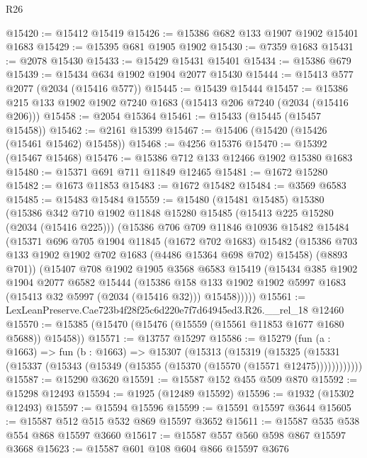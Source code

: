 \begin{lexlean}{R26}
\begin{coremodule}
@15420 := @15412 @15419
@15426 := @15386 @682 @133 @1907 @1902 @15401 @1683
@15429 := @15395 @681 @1905 @1902
@15430 := @7359 @1683
@15431 := @2078 @15430
@15433 := @15429 @15431 @15401
@15434 := @15386 @679
@15439 := @15434 @634 @1902 @1904 @2077 @15430
@15444 := @15413 @577 @2077 (@2034 (@15416 @577))
@15445 := @15439 @15444
@15457 := @15386 @215 @133 @1902 @1902 @7240 @1683 (@15413 @206 @7240 (@2034 (@15416 @206)))
@15458 := @2054 @15364
@15461 := @15433 (@15445 (@15457 @15458))
@15462 := @2161 @15399
@15467 := @15406 (@15420 (@15426 (@15461 @15462) @15458))
@15468 := @4256 @15376
@15470 := @15392 (@15467 @15468)
@15476 := @15386 @712 @133 @12466 @1902 @15380 @1683
@15480 := @15371 @691 @711 @11849 @12465
@15481 := @1672 @15280
@15482 := @1673 @11853
@15483 := @1672 @15482
@15484 := @3569 @6583
@15485 := @15483 @15484
@15559 := @15480
    (@15481 @15485)
    @15380
    (@15386
      @342
      @710
      @1902
      @11848
      @15280
      @15485
      (@15413 @225 @15280 (@2034 (@15416 @225)))
      (@15386
        @706
        @709
        @11846
        @10936
        @15482
        @15484
        (@15371
          @696
          @705
          @1904
          @11845
          (@1672 @702 @1683)
          @15482
          (@15386 @703 @133 @1902 @1902 @702 @1683 (@4486 @15364 @698 @702) @15458)
          (@8893 @701))
        (@15407
          @708
          @1902
          @1905
          @3568
          @6583
          @15419
          (@15434
            @385
            @1902
            @1904
            @2077
            @6582
            @15444
            (@15386
              @158
              @133
              @1902
              @1902
              @5997
              @1683
              (@15413 @32 @5997 (@2034 (@15416 @32)))
              @15458)))))
@15561 := LexLeanPreserve.Cae723b4f28f25c6d220e7f7d64945ed3.R26.__rel_18 @12460
@15570 := @15385 (@15470 (@15476 (@15559 (@15561 @11853 @1677 @1680 @5688)) @15458))
@15571 := @13757 @15297
@15586 := @15279
    (fun (a : @1663) =>
    fun (b : @1663) =>
    @15307
      (@15313
        (@15319
          (@15325 (@15331 (@15337 (@15343 (@15349 (@15355 (@15370 (@15570 (@15571 @12475))))))))))))
@15587 := @15290 @3620
@15591 := @15587 @152 @455 @509 @870
@15592 := @15298 @12493
@15594 := @1925 (@12489 @15592)
@15596 := @1932 (@15302 @12493)
@15597 := @15594 @15596
@15599 := @15591 @15597 @3644
@15605 := @15587 @512 @515 @532 @869 @15597 @3652
@15611 := @15587 @535 @538 @554 @868 @15597 @3660
@15617 := @15587 @557 @560 @598 @867 @15597 @3668
@15623 := @15587 @601 @108 @604 @866 @15597 @3676

\end{coremodule}
\end{lexlean}
